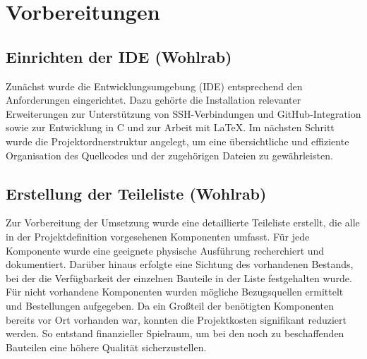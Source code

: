\chapter{Vorbereitungen}

\section{Einrichten der IDE (Wohlrab)} 

Zunächst wurde die Entwicklungsumgebung (IDE) entsprechend den Anforderungen eingerichtet. 
Dazu gehörte die Installation relevanter Erweiterungen zur Unterstützung von SSH-Verbindungen und GitHub-Integration sowie zur Entwicklung in C und zur Arbeit mit LaTeX. 
Im nächsten Schritt wurde die Projektordnerstruktur angelegt, um eine übersichtliche und effiziente Organisation des Quellcodes und der zugehörigen Dateien zu gewährleisten.

\section{Erstellung der Teileliste (Wohlrab)}

Zur Vorbereitung der Umsetzung wurde eine detaillierte Teileliste erstellt, die alle in der Projektdefinition vorgesehenen Komponenten umfasst. 
Für jede Komponente wurde eine geeignete physische Ausführung recherchiert und dokumentiert. 
Darüber hinaus erfolgte eine Sichtung des vorhandenen Bestands, bei der die Verfügbarkeit der einzelnen Bauteile in der Liste festgehalten wurde. 
Für nicht vorhandene Komponenten wurden mögliche Bezugsquellen ermittelt und Bestellungen aufgegeben. 
Da ein Großteil der benötigten Komponenten bereits vor Ort vorhanden war, konnten die Projektkosten signifikant reduziert werden. 
So entstand finanzieller Spielraum, um bei den noch zu beschaffenden Bauteilen eine höhere Qualität sicherzustellen.
